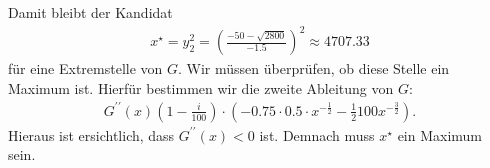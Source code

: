 Damit bleibt der Kandidat 
\begin{align*}
	x^\star = y_2^2 = 
	\left(\frac{-50 - \sqrt{2800}}{-1.5}\right)^2
	\approx
	4707.33
\end{align*}
für eine Extremstelle von $ G $. Wir müssen überprüfen, ob diese Stelle ein Maximum ist.
Hierfür bestimmen wir die zweite Ableitung von $ G $:
\begin{align*}
	G^{\prime \prime}(x)
	\left(1 - \frac{i}{100}\right)\cdot 
	\left(
	-0.75 \cdot 0.5\cdot x^{- \frac{1}{2}} - \frac{1}{2} 100 x^{- \frac{3}{2}}
	\right).
\end{align*}
Hieraus ist ersichtlich, dass $ G^{\prime \prime}(x) < 0 $ ist.
Demnach muss $ x^\star $ ein Maximum sein.




